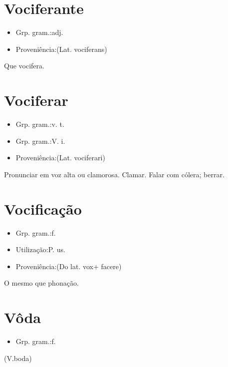 \documentclass{article}
\begin{document}
\section{Vociferante}
\begin{itemize}
\item {Grp. gram.:adj.}
\end{itemize}
\begin{itemize}
\item {Proveniência:(Lat. \textunderscore vociferans\textunderscore )}
\end{itemize}
Que vocifera.
\section{Vociferar}
\begin{itemize}
\item {Grp. gram.:v. t.}
\end{itemize}
\begin{itemize}
\item {Grp. gram.:V. i.}
\end{itemize}
\begin{itemize}
\item {Proveniência:(Lat. \textunderscore vociferari\textunderscore )}
\end{itemize}
Pronunciar em voz alta ou clamorosa.
Clamar.
Falar com cólera; berrar.
\section{Vocificação}
\begin{itemize}
\item {Grp. gram.:f.}
\end{itemize}
\begin{itemize}
\item {Utilização:P. us.}
\end{itemize}
\begin{itemize}
\item {Proveniência:(Do lat. \textunderscore vox\textunderscore  + \textunderscore facere\textunderscore )}
\end{itemize}
O mesmo que \textunderscore phonação\textunderscore .
\section{Vôda}
\begin{itemize}
\item {Grp. gram.:f.}
\end{itemize}
(V.boda)
\end{document}
